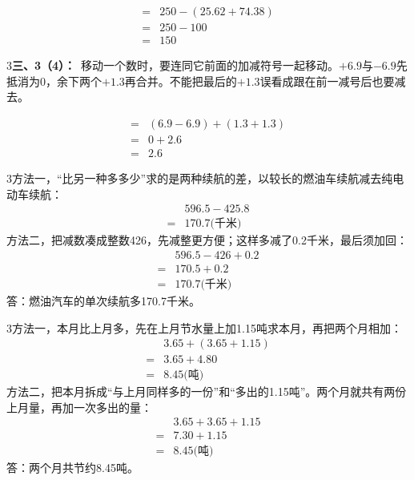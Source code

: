 \documentclass[multi=snippet,border={5bp 20bp 5bp 5bp}]{standalone}
\newenvironment{snippet}[3]{\begin{minipage}{#1bp}\color{answerred}\fontsize{#2}{#3}\selectfont\raggedright}{\end{minipage}}
\begin{document}
\begin{snippet}{196.00000000000003}{10.5}{12.8}\SourceSans\setlength{\mathindent}{2bp}\[\begin{aligned}={}&250-(25.62+74.38)\\={}&250-100\\={}&150\end{aligned}\]\end{snippet}
\begin{snippet}{505}{11.5}{14}\begin{multicols}{3}\raggedcolumns \textbf{三、3（4）：}\ 移动一个数时，要连同它前面的加减符号一起移动。\(+6.9\)\allowbreak 与\(-6.9\)\allowbreak 先抵消为0，余下两个\(+1.3\)\allowbreak 再合并。不能把最后的\(+1.3\)\allowbreak 误看成跟在前一减号后也要减去。\end{multicols}\end{snippet}
\begin{snippet}{232.0}{10.5}{12.8}\SourceSans\setlength{\mathindent}{2bp}\[\begin{aligned}={}&(6.9-6.9)+(1.3+1.3)\\={}&0+2.6\\={}&2.6\end{aligned}\]\end{snippet}
\begin{snippet}{505}{11.5}{14}\begin{multicols}{3}\raggedcolumns 方法一，“比另一种多多少”求的是两种续航的差，以较长的燃油车续航减去纯电动车续航：\[\begin{aligned}&596.5-425.8\\={}&170.7\text{(千米)}\end{aligned}\]方法二，把减数凑成整数426，先减整更方便；这样多减了0.2千米，最后须加回：\[\begin{aligned}&596.5-426+0.2\\={}&170.5+0.2\\={}&170.7\text{(千米)}\end{aligned}\]答：燃油汽车的单次续航多170.7千米。\end{multicols}\end{snippet}
\begin{snippet}{505}{11.5}{14}\begin{multicols}{3}\raggedcolumns 方法一，本月比上月多，先在上月节水量上加1.15吨求本月，再把两个月相加：\[\begin{aligned}&3.65+(3.65+1.15)\\={}&3.65+4.80\\={}&8.45\text{(吨)}\end{aligned}\]方法二，把本月拆成“与上月同样多的一份”和“多出的1.15吨”。两个月就共有两份上月量，再加一次多出的量：\[\begin{aligned}&3.65+3.65+1.15\\={}&7.30+1.15\\={}&8.45\text{(吨)}\end{aligned}\]答：两个月共节约8.45吨。\end{multicols}\end{snippet}
\end{document}
